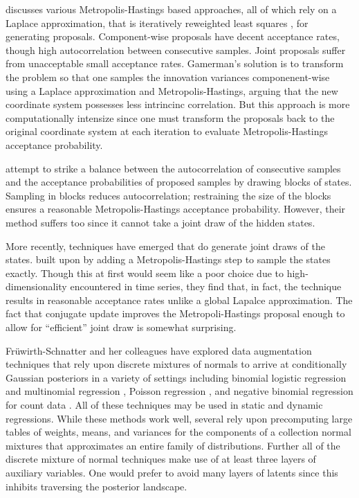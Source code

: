 \documentclass[11pt]{article}
\begin{document}
\cite{gamerman-1998} discusses various Metropolis-Hastings based approaches, all
of which rely on a Laplace approximation, that is iteratively reweighted least
squares \citep{wedderburn-1974}, for generating proposals. Component-wise
proposals have decent acceptance rates, though high autocorrelation between
consecutive samples.  Joint proposals suffer from unacceptable small acceptance
rates.  Gamerman's solution is to transform the problem so that one samples the
innovation variances componenent-wise using a Laplace approximation and
Metropolis-Hastings, arguing that the new coordinate system possesses less
intrincinc correlation.  But this approach is more computationally intensize
since one must transform the proposals back to the original coordinate system at
each iteration to evaluate Metropolis-Hastings acceptance probability.

\cite{shephard-pitt-1997} attempt to strike a balance between the
autocorrelation of consecutive samples and the acceptance probabilities of
proposed samples by drawing blocks of states.  Sampling in blocks reduces
autocorrelation; restraining the size of the blocks ensures a reasonable
Metropolis-Hastings acceptance probability.  However, their method suffers too
since it cannot take a joint draw of the hidden states.

More recently, techniques have emerged that do generate joint draws of the
states.  \cite{ravines-etal-2006} built upon \cite{west-etal-1985} by adding a
Metropolis-Hastings step to sample the states exactly.  Though this at first
would seem like a poor choice due to high-dimensionality encountered in time
series, they find that, in fact, the technique results in reasonable acceptance
rates unlike a global Lapalce approximation.  The fact that conjugate update
improves the Metropoli-Hastings proposal enough to allow for ``efficient'' joint
draw is somewhat surprising.

Fr\"{u}wirth-Schnatter and her colleagues have explored data augmentation
techniques that rely upon discrete mixtures of normals to arrive at
conditionally Gaussian posteriors in a variety of settings including binomial
logistic regression and multinomial regression
\citep{fruhwirth-schnatter-fruhwirth-2007, fruhwirth-schnatter-fruhwirth-2010,
  fussl-etal-2013}, Poisson regression \citep{fruhwirth-schnatter-wagner-2006,
  fruhwirth-schnatter-etal-2009}, and negative binomial regression for count
data \citep{fruhwirth-schnatter-etal-2009}.  All of these techniques may be used
in static and dynamic regressions.  While these methods work well, several rely
upon precomputing large tables of weights, means, and variances for the
components of a collection normal mixtures that approximates an entire family of
distributions.  Further all of the discrete mixture of normal techniques make
use of at least three layers of auxiliary variables.  One would prefer to avoid
many layers of latents since this inhibits traversing the posterior landscape.
\end{document}
